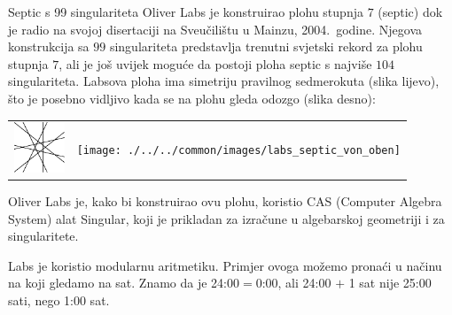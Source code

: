 \begin{surferPage}{Septic s 99 singulariteta}
		Oliver Labs je konstruirao plohu stupnja $7$ (septic) dok je radio na svojoj
		disertaciji na Sveu\v cili\v stu u Mainzu, 2004.\ godine. Njegova konstrukcija 
		sa $99$ singulariteta predstavlja trenutni svjetski rekord za plohu stupnja $7$, ali je jo\v s
		uvijek mogu\' ce da postoji ploha septic s najvi\v se $104$ singulariteta.
		Labsova ploha ima simetriju pravilnog sedmerokuta (slika lijevo), \v sto je posebno vidljivo
		kada se na plohu gleda odozgo (slika desno):
		
		\vspace*{-0.3em}
    \begin{center}
      \begin{tabular}{c@{\qquad}c}
        \includegraphics[height=1.5cm]{./../../common/images/labsseptic1.pdf}
        &
        \texttt{[image: ./../../common/images/labs\_septic\_von\_oben]}
      \end{tabular}
    \end{center}
    \vspace*{-0.3em}
		
		Oliver Labs je, kako bi konstruirao ovu plohu, koristio CAS (Computer Algebra System) alat
		{\sc Singular}, koji je prikladan za izra\v cune u algebarskoj geometriji i za singularitete.
		
		Labs je koristio modularnu aritmetiku. Primjer ovoga mo\v zemo prona\' ci u na\v cinu na koji 
		gledamo na sat. Znamo da je 24:00$=$0:00, ali 24:00 $+$ 1 sat nije 25:00 sati, nego 1:00 sat.
\end{surferPage}

